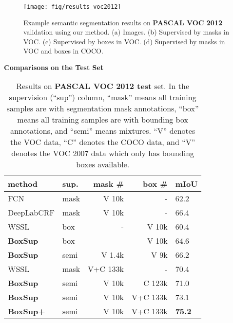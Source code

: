 \documentclass[10pt,twocolumn,letterpaper]{article}
\newcommand{\tn}[1]{\footnotesize{#1}}
\begin{document}
\begin{figure*}[t]
	\centering
	\texttt{[image: fig/results\_voc2012]}
	\caption{Example semantic segmentation results on \textbf{PASCAL VOC 2012} validation using our method. (a) Images. (b) Supervised by masks in VOC. (c) Supervised by boxes in VOC. (d) Supervised by masks in VOC and boxes in COCO.}
	\label{fig:results}
\end{figure*}

\vspace{8pt}
\noindent\textbf{Comparisons on the Test Set}

\setlength{\tabcolsep}{4pt}
\renewcommand{\arraystretch}{1.1}
\begin{table}[t]
	\begin{center}
\begin{small}
		\begin{tabular}{x|x|r|r|x}
			\hline
			method & sup. & mask \# & box \# & mIoU\\
			\hline
			\hline
			FCN  \cite{Long2015} & mask & V 10k & - & 62.2\\
			\tn{DeepLabCRF}  \cite{Chen2015} & mask & V 10k & - & 66.4\\
			WSSL \cite{papandreou2015weakly} & box & - & V 10k & 60.4\\
			\textbf{BoxSup} & box & - & V 10k  & 64.6\\
			\textbf{BoxSup} & semi & V 1.4k & V 9k & 66.2\\
			\hline
			WSSL \cite{papandreou2015weakly} & mask & V+C 133k & - & 70.4\\
			\textbf{BoxSup} & semi & V 10k  & C 123k & 71.0\\
			\textbf{BoxSup} & semi & V 10k  & V+C 133k & 73.1 \\
			\textbf{BoxSup+} & semi & V 10k  & V+C 133k & \textbf{75.2}\\
            \hline
		\end{tabular}
\end{small}
	\end{center}
	\caption{Results on \textbf{PASCAL VOC 2012 test} set. In the supervision (``sup'') column, ``mask'' means all training samples are with segmentation mask annotations, ``box'' means all training samples are with bounding box annotations, and ``semi'' means mixtures. ``V'' denotes the VOC data, ``C'' denotes the COCO data, and ``V'' denotes the VOC 2007 data which only has bounding boxes available.}
	\label{tab:voc2012_test}
\end{table}
\end{document}
